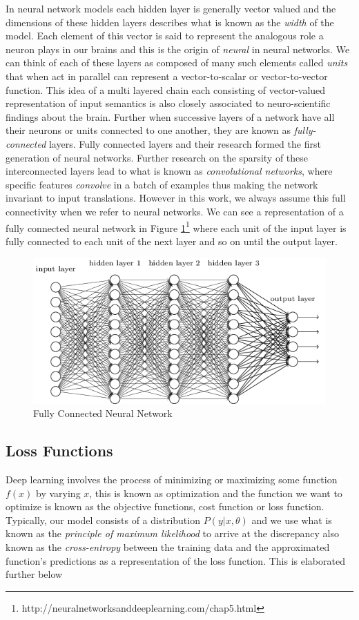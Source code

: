 \documentclass[14pt]{extarticle}
\numberwithin{equation}{section}
\begin{document}
	In neural network models each hidden layer is generally vector valued and the dimensions of these hidden layers describes what is known as the \textit{width} of the model. Each element of this vector is said to represent the analogous role a neuron plays in our brains and this is the origin of \textit{neural} in neural networks. We can think of each of these layers as composed of many such elements called \textit{units} that when act in parallel can represent a vector-to-scalar or vector-to-vector function. This idea of a multi layered chain each consisting of vector-valued representation of input semantics is also closely associated to neuro-scientific findings about the brain. Further when successive layers of a network have all their neurons or units connected to one another, they are known as \textit{fully-connected} layers. Fully connected layers and their research formed the first generation of neural networks. Further research on the sparsity of these interconnected layers lead to what is known as \textit{convolutional networks}\cite{LeCun:1998:CNI:303568.303704}, where specific features \textit{convolve} in a batch of examples thus making the network invariant to input translations. However in this work, we always assume this full connectivity when we refer to neural networks. We can see a representation of a fully connected neural network in Figure \ref{nn-fully-connected}\footnote{http://neuralnetworksanddeeplearning.com/chap5.html} where each unit of the input layer is fully connected to each unit of the next layer and so on until the output layer.
	\begin{figure}[h]
		\vspace{0.2cm}
		\centering
		\includegraphics[scale=0.7]{neuralnetwork}
		\caption{Fully Connected Neural Network
			\label{nn-fully-connected}}
	\end{figure}
	\subsection{Loss Functions}
	Deep learning involves the process of minimizing or maximizing some function $f(x)$ by varying $x$\cite{Goodfellow-et-al-2016}, this is known as optimization and the function we want to optimize is known as the objective functions, cost function or loss function. Typically, our model consists of a distribution $P(y | x, \theta)$ and we use what is known as the \textit{principle of maximum likelihood} to arrive at the discrepancy also known as the \textit{cross-entropy} between the training data and the approximated function's predictions as a representation of the loss function. This is elaborated further below
\end{document}
